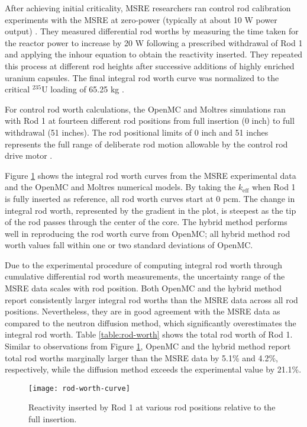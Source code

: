 After achieving initial criticality, \gls{MSRE} researchers ran control rod calibration experiments
with the \gls{MSRE} at zero-power (typically at about 10 W power output)
\cite{prince_zero-power_1968}. They measured differential rod worths by measuring the time taken
for the reactor power to increase by 20 W following a prescribed withdrawal of Rod 1 and applying
the inhour equation to obtain the reactivity inserted. They repeated this process at different rod
heights after successive additions of highly enriched uranium capsules. The final integral rod
worth curve was normalized to the critical $^{235}$U loading of 65.25 kg
\cite{prince_zero-power_1968}.

For control rod worth calculations, the OpenMC and Moltres simulations ran with Rod 1 at fourteen
different rod positions from full insertion (0 inch) to full withdrawal (51 inches). The rod
positional limits of 0 inch and 51 inches represents the full range of deliberate rod motion
allowable by the control rod drive motor \cite{robertson_msre_1965}.

Figure \ref{fig:rod-worth} shows the integral rod worth curves from the \gls{MSRE} experimental
data and the OpenMC and Moltres numerical models. By taking the $k_\text{eff}$ when Rod 1 is fully
inserted as reference, all rod worth curves start at 0 pcm. The change in integral rod worth,
represented by the gradient in the plot, is steepest as the tip of the rod passes through the
center of the core. The hybrid method performs well in reproducing the rod worth curve from OpenMC;
all hybrid method rod worth values fall within one or two standard deviations of OpenMC.

Due to the experimental procedure of computing integral rod worth through cumulative differential
rod worth measurements, the uncertainty range of the \gls{MSRE} data scales with rod position.
Both OpenMC and the hybrid method report consistently larger integral rod worths than the
\gls{MSRE} data across all rod positions. Nevertheless, they are in good agreement with the
\gls{MSRE} data as compared to the neutron diffusion method, which significantly overestimates the
integral rod worth.
Table \ref{table:rod-worth} shows the total rod worth of Rod 1. Similar to observations from Figure
\ref{fig:rod-worth}, OpenMC and the hybrid method report total rod worths marginally larger than
the \gls{MSRE} data by 5.1\% and 4.2\%, respectively, while the diffusion method exceeds the
experimental value by 21.1\%.

\begin{figure}[t]
  \centering
  \texttt{[image: rod-worth-curve]}
  \caption{Reactivity inserted by Rod 1 at various rod positions relative to the full insertion.}
  \label{fig:rod-worth}
\end{figure}

